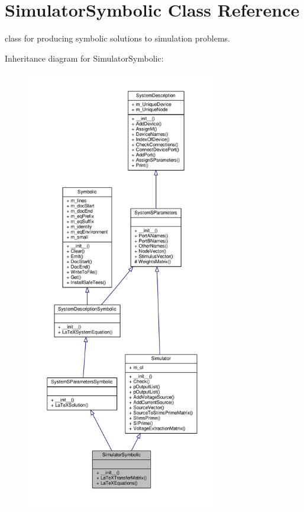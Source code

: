 \hypertarget{classSignalIntegrity_1_1SystemDescriptions_1_1SimulatorSymbolic_1_1SimulatorSymbolic}{}\section{Simulator\+Symbolic Class Reference}
\label{classSignalIntegrity_1_1SystemDescriptions_1_1SimulatorSymbolic_1_1SimulatorSymbolic}


class for producing symbolic solutions to simulation problems.  




Inheritance diagram for Simulator\+Symbolic\+:
\nopagebreak
\begin{figure}[H]
\begin{center}
\leavevmode
\includegraphics[height=550pt]{classSignalIntegrity_1_1SystemDescriptions_1_1SimulatorSymbolic_1_1SimulatorSymbolic__inherit__graph}
\end{center}
\end{figure}


